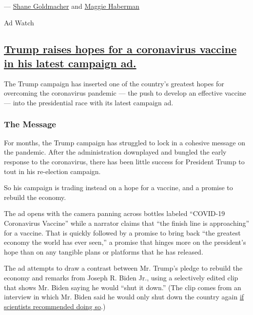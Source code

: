 --- \href{https://www.nytimes3xbfgragh.onion/by/shane-goldmacher}{Shane
Goldmacher} and
\href{https://www.nytimes3xbfgragh.onion/by/maggie-haberman}{Maggie
Haberman}

Ad Watch

\hypertarget{trump-raises-hopes-for-a-coronavirus-vaccine-in-his-latest-campaign-ad}{%
\subsection{\texorpdfstring{\protect\hyperlink{trump-raises-hopes-for-a-coronavirus-vaccine-in-his-latest-campaign-ad}{Trump
raises hopes for a coronavirus vaccine in his latest campaign
ad.}}{Trump raises hopes for a coronavirus vaccine in his latest campaign ad.}}\label{trump-raises-hopes-for-a-coronavirus-vaccine-in-his-latest-campaign-ad}}

The Trump campaign has inserted one of the country's greatest hopes for
overcoming the coronavirus pandemic --- the push to develop an effective
vaccine --- into the presidential race with its latest campaign ad.

\hypertarget{the-message}{%
\subsubsection{The Message}\label{the-message}}

For months, the Trump campaign has struggled to lock in a cohesive
message on the pandemic. After the administration downplayed and bungled
the early response to the coronavirus, there has been little success for
President Trump to tout in his re-election campaign.

So his campaign is trading instead on a hope for a vaccine, and a
promise to rebuild the economy.

The ad opens with the camera panning across bottles labeled ``COVID-19
Coronavirus Vaccine'' while a narrator claims that ``the finish line is
approaching'' for a vaccine. That is quickly followed by a promise to
bring back ``the greatest economy the world has ever seen,'' a promise
that hinges more on the president's hope than on any tangible plans or
platforms that he has released.

The ad attempts to draw a contrast between Mr. Trump's pledge to rebuild
the economy and remarks from Joseph R. Biden Jr., using a selectively
edited clip that shows Mr. Biden saying he would ``shut it down.'' (The
clip comes from an interview in which Mr. Biden said he would only shut
down the country again
\href{https://www.cnn.com/2020/08/22/politics/biden-coronavirus-shutdown/index.html}{if
scientists recommended doing so}.)

